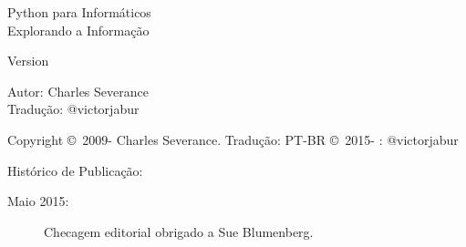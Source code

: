 



\newtheorem{ex}{Exercise}[chapter]

\begin{latexonly}

\renewcommand{\blankpage}{\thispagestyle{empty} \quad \newpage}

\thispagestyle{empty}

\begin{flushright}
\vspace*{2.0in}

\begin{spacing}{3}
{\huge Python para Informáticos}\\
{\Large Explorando a Informação}
\end{spacing}

\vspace{0.25in}

Version \theversion

\vspace{0.5in}


{\Large
Autor: Charles Severance\\
Tradução: @victorjabur
}

\vfill

\end{flushright}

\pagebreak
\thispagestyle{empty}

{\small
Copyright \copyright ~2009- Charles Severance.
Tradução: PT-BR \copyright ~2015- : @victorjabur

Histórico de Publicação:

\begin{description}

\item[Maio 2015:] Checagem editorial obrigado a Sue Blumenberg.


\end{description}}
\end{latexonly}
